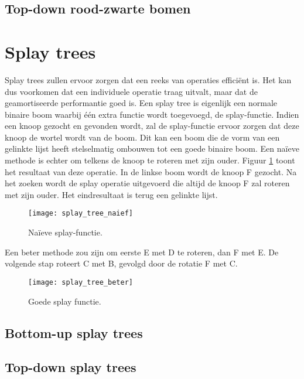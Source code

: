 \documentclass{report}
\begin{document}
	\subsection{Top-down rood-zwarte bomen}
	
	


	
	\section{Splay trees}
	Splay trees zullen ervoor zorgen dat een reeks van operaties efficiënt is. Het kan dus voorkomen dat een individuele operatie traag uitvalt, maar dat de geamortiseerde performantie goed is. Een splay tree is eigenlijk een normale binaire boom waarbij één extra functie wordt toegevoegd, de splay-functie. Indien een knoop gezocht en gevonden wordt, zal de splay-functie ervoor zorgen dat deze knoop de wortel wordt van de boom. Dit kan een boom die de vorm van een gelinkte lijst heeft stelselmatig ombouwen tot een goede binaire boom. Een naïeve methode is echter om telkens de knoop te roteren met zijn ouder. Figuur \ref{fig:splay_tree_naief} toont het resultaat van deze operatie. In de linkse boom wordt de knoop F gezocht. Na het zoeken wordt de splay operatie uitgevoerd die altijd de knoop F zal roteren met zijn ouder. Het eindresultaat is terug een gelinkte lijst.
	\begin{figure}[h]
		\centering
		\texttt{[image: splay\_tree\_naief]}
		\caption{Naïeve splay-functie.}
		\label{fig:splay_tree_naief}
	\end{figure}
	Een beter methode zou zijn om eerste E met D te roteren, dan F met E. De volgende stap roteert C met B, gevolgd door de rotatie F met C.
	\begin{figure}[h]
		\centering
		\texttt{[image: splay\_tree\_beter]}
		\caption{Goede splay functie.}
		\label{fig:splay_tree_beter}
	\end{figure}

	\subsection{Bottom-up splay trees}
	
	\subsection{Top-down splay trees}
\end{document}
